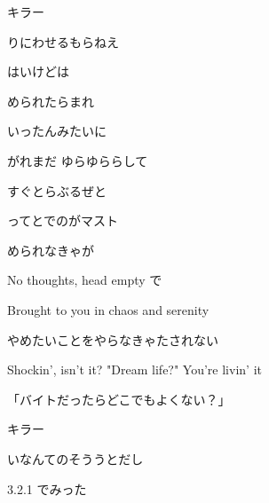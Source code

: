 \documentclass[a4paper,tate,twocolumn,12pt]{ltjtarticle}
\begin{document}
\thispagestyle{empty}

\begin{center}
{\LARGE {}キラー}
\end{center}

\vspace{1em}

\begin{flushleft}

\noindent\begin{minipage}{\linewidth}
りにわせるもらねえ

はいけどは

められたらまれ

いったんみたいに

がれまだ ゆらゆららして

すぐとらぶるぜと

ってとでのがマスト
\end{minipage}

\vspace{2em}

\noindent\begin{minipage}{\linewidth}
められなきゃが

No thoughts, head empty で

Brought to you in chaos and serenity

やめたいことをやらなきゃたされない

Shockin', isn't it? "Dream life?" You're livin' it

「バイトだったらどこでもよくない？」

キラー
\end{minipage}

\vspace{2em}

\noindent\begin{minipage}{\linewidth}
いなんてのそううとだし

3.2.1 でみった


\end{minipage}
\end{flushleft}
\end{document}
